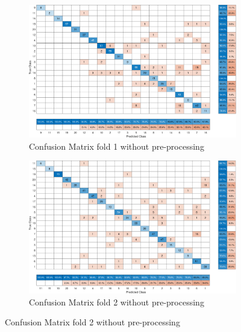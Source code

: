 \documentclass[letterpaper]{article} %
\begin{document}
\begin{figure}
    \centering
    \begin{subfigure}{0.45\textwidth}
        \includegraphics[width=\textwidth,height=0.25\textheight]{No_Preprocessing_fold1_80_20_acc_0.81457.pdf}
        \caption{Confusion Matrix fold 1 without pre-processing}
    \end{subfigure}
    \begin{subfigure}{0.45\textwidth}
        \includegraphics[width=\textwidth,height=0.25\textheight]{No_Preprocessing_fold2_80_20_acc_0.83311.pdf}
        \caption{Confusion Matrix fold 2 without pre-processing}
    \end{subfigure}


\end{figure}
\end{document}
